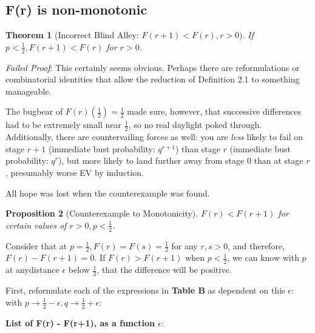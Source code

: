 \documentclass[11pt, oneside]{article} 	%
\newtheorem{theorem}{Theorem}[section]
\newtheorem{proposition}[theorem]{Proposition}
\begin{document}
\subsection{F(r) is non-monotonic}


\begin{theorem}[Incorrect Blind Alley: $F(r+1) < F(r), r > 0$] If $p < \frac1{2}, F(r+1) < F(r)$ for $r > 0$.\end{theorem}
\textit{Failed Proof}: This certainly seems obvious.  Perhaps there are reformulations or combinatorial identities that allow the reduction of Definition 2.1 to something manageable.

The bugbear of $F(r)(\frac1{2})=\frac1{2}$ made sure, however, that successive differences had to be extremely small near $\frac1{2}$, so no real daylight poked through. Additionally, there are countervailing forces as well: you are \textit{less} likely to fail on stage $r+1$ (immediate bust probability: $q^{r+1}$) than stage $r$ (immediate bust probability: $q^r$), but more likely to land further away from stage 0 than at stage $r$, presumably worse EV by induction.

All hope was lost when the counterexample was found.

\begin{proposition}[Counterexample to Monotonicity]$F(r) < F(r+1)$ for certain values of $r > 0, p < \frac1{2}$.\end{proposition}

Consider that at $p = \frac1{2}, F(r) = F(s) = \frac1{2}$ for any $r, s > 0$, and therefore, $F(r) - F(r+1) = 0$.  If $F(r) > F(r+1)$ when $p < \frac1{2}$, we can know with $p$ at anydistance $\epsilon$ below $\frac1{2}$, that the difference will be positive.
  
First, reformulate each of the expressions in \textbf{Table B} as dependent on this $\epsilon$: with $p \rightarrow \frac1{2} - \epsilon,  q \rightarrow \frac1{2} + \epsilon$:

\textbf{List of F(r) - F(r+1), as a function $\epsilon$}:
\end{document}

